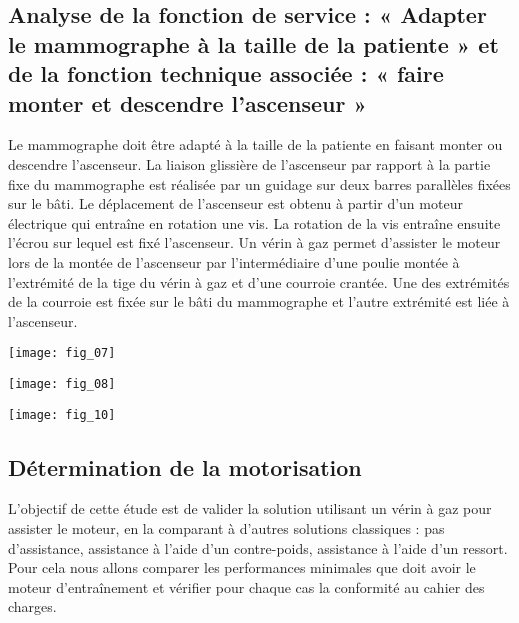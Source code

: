 \begin{multicols}{2}
\subsection*{Analyse de la fonction de service : « Adapter le
mammographe à la taille de la patiente » et de la fonction
technique associée : « faire monter et descendre
l’ascenseur »}

Le mammographe doit être adapté à la taille de la patiente en faisant monter
ou descendre l’ascenseur. La liaison glissière de l’ascenseur par rapport à la partie
fixe du mammographe est réalisée par un guidage sur deux barres parallèles
fixées sur le bâti. Le déplacement de l’ascenseur est obtenu à partir d’un moteur
électrique qui entraîne en rotation une vis. La rotation de la vis entraîne ensuite
l’écrou sur lequel est fixé l’ascenseur.
Un vérin à gaz permet d’assister le moteur lors de la montée de l’ascenseur par
l’intermédiaire d’une poulie montée à l’extrémité de la tige du vérin à gaz et
d’une courroie crantée. Une des extrémités de la courroie est fixée sur le bâti du
mammographe et l’autre extrémité est liée à l’ascenseur.

\begin{center}
\texttt{[image: fig\_07]}
\end{center}

\begin{center}
\texttt{[image: fig\_08]}
\end{center}

\begin{center}
\texttt{[image: fig\_10]}
\end{center}

%

\subsection*{Détermination de la motorisation}
\begin{obj}
L’objectif de cette étude est de valider la solution utilisant un vérin à gaz
pour assister le moteur, en la comparant à d’autres solutions
classiques : pas d’assistance, assistance à l’aide d’un contre-poids,
assistance à l’aide d’un ressort. Pour cela nous allons comparer les performances
minimales que doit avoir le moteur d’entraînement et vérifier
pour chaque cas la conformité au cahier des charges.
\end{obj}


\end{multicols}
